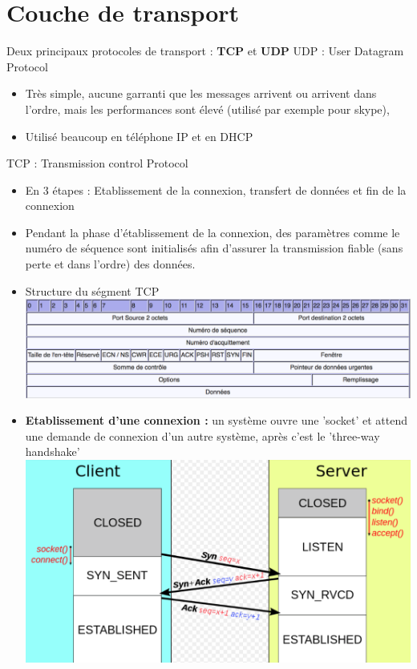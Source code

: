 \documentclass[a4paper,9pt, twocolumn]{article}
\begin{document}
\section*{Couche de transport}
Deux principaux protocoles de transport : \textbf{TCP} et \textbf{UDP}
UDP : User Datagram Protocol 
\begin{itemize}
\item Très simple, aucune garranti que les messages arrivent ou arrivent dans l'ordre, mais les performances sont élevé (utilisé par exemple pour skype), 
\item Utilisé beaucoup en téléphone IP et en DHCP
\end{itemize}
TCP : Transmission control Protocol
\begin{itemize}
\item En 3 étapes : Etablissement de la connexion, transfert de données et fin de la connexion
\item Pendant la phase d'établissement de la connexion, des paramètres comme le numéro de séquence sont initialisés afin d'assurer la transmission fiable (sans perte et dans l'ordre) des données.
\item Structure du ségment TCP 
\includegraphics[scale=0.28]{tc.png}
\item \textbf{Etablissement d'une connexion :} un système ouvre une 'socket' et attend une demande de connexion d'un autre système, après c'est le 'three-way handshake'
\includegraphics[scale=0.28]{hand.png}


\end{itemize}
\end{document}
